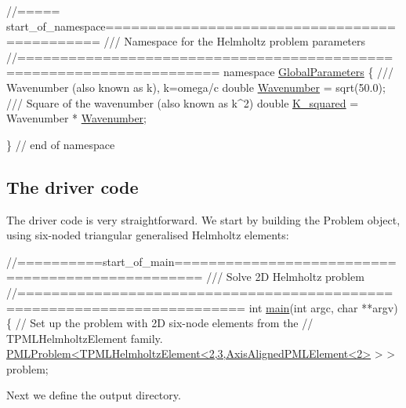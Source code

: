  
\begin{DoxyCodeInclude}
\textcolor{comment}{//===== start\_of\_namespace=============================================}
\textcolor{comment}{/// Namespace for the Helmholtz problem parameters}
\textcolor{comment}{}\textcolor{comment}{//=====================================================================}
\textcolor{keyword}{namespace }\hyperlink{namespaceGlobalParameters}{GlobalParameters}
\{
\textcolor{comment}{}
\textcolor{comment}{ /// Wavenumber (also known as k), k=omega/c}
\textcolor{comment}{} \textcolor{keywordtype}{double} \hyperlink{namespaceGlobalParameters_a571b847702904d4cf646ac7ff17a7d2c}{Wavenumber} = sqrt(50.0);
\textcolor{comment}{}
\textcolor{comment}{ /// Square of the wavenumber (also known as k^2)}
\textcolor{comment}{} \textcolor{keywordtype}{double} \hyperlink{namespaceGlobalParameters_aae73cb63b27d51a87845c3392cd944eb}{K\_squared} = Wavenumber * \hyperlink{namespaceGlobalParameters_a571b847702904d4cf646ac7ff17a7d2c}{Wavenumber};

\} \textcolor{comment}{// end of namespace}

\end{DoxyCodeInclude}
\hypertarget{index_main}{}\subsection{The driver code}\label{index_main}
The driver code is very straightforward. We start by building the {\ttfamily Problem} object, using six-\/noded triangular generalised Helmholtz elements\+:

 
\begin{DoxyCodeInclude}
\textcolor{comment}{//==========start\_of\_main=================================================}
\textcolor{comment}{/// Solve 2D Helmholtz problem}
\textcolor{comment}{}\textcolor{comment}{//========================================================================}
\textcolor{keywordtype}{int} \hyperlink{unstructured__two__d__helmholtz_8cc_a3c04138a5bfe5d72780bb7e82a18e627}{main}(\textcolor{keywordtype}{int} argc, \textcolor{keywordtype}{char} **argv)
\{
 \textcolor{comment}{// Set up the problem with 2D six-node elements from the}
 \textcolor{comment}{// TPMLHelmholtzElement family.}
 \hyperlink{classPMLProblem}{PMLProblem<TPMLHelmholtzElement<2,3,AxisAlignedPMLElement<2>}
      > >  problem;

\end{DoxyCodeInclude}


Next we define the output directory.


